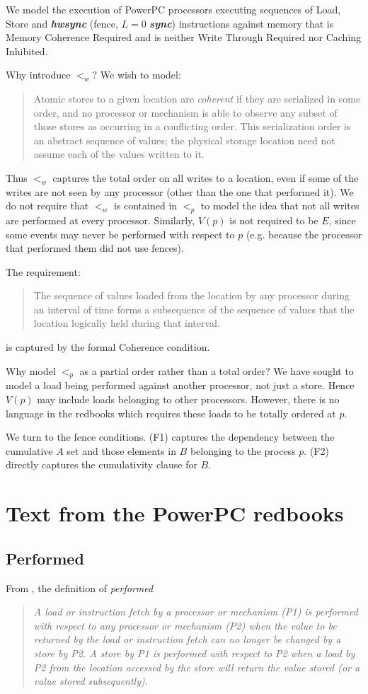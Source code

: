 \documentclass[10pt]{article}
\def\sync{\mbox{\bf\em sync}}
\begin{document}
We model the execution of PowerPC processors executing sequences of
Load, Store and {\em\bf hwsync} (fence, $L=0$ \sync) instructions
against memory that is Memory Coherence Required and is neither Write
Through Required nor Caching Inhibited.


Why introduce $<_w$? We wish to model:
\begin{quotation}
  Atomic stores to a given location are {\em coherent} if they
  are serialized in some order, and no processor or mechanism is able to
  observe any subset of those stores as occurring in a conflicting
  order. This serialization order is an abstract sequence of values; the
  physical storage location need not assume each of the values written to
  it. 
\end{quotation}
Thus $<_w$ captures the total order on all writes to a location, even
if some of the writes are not seen by any processor (other than the
one that performed it).  We do not require that $<_w$ is contained in
$<_p$ to model the idea that not all writes are performed at every
processor. Similarly, $V(p)$ is not required to be $E$, since some
events may never be performed with respect to $p$ (e.g.{} because the
processor that performed them did not use fences).

The requirement:
\begin{quotation}
The sequence of values loaded from the location by any processor
during an interval of time forms a subsequence of the sequence of
values that the location logically held during that interval.
\end{quotation}
is captured by the formal Coherence condition.

Why model $<_p$ as a partial order rather than a total order?  We have
sought to model a load being performed against another processor, not
just a store. Hence $V(p)$ may include loads belonging to other
processors. However, there is no language in the redbooks which
requires these loads to be totally ordered at $p$.

We turn to the fence conditions. (F1) captures the dependency between
the cumulative $A$ set and those elements in $B$ belonging to the
process $p$. (F2) directly captures the cumulativity clause for $B$.

\section{Text from the PowerPC redbooks}

\subsection{Performed}\label{sec:performed}
From \cite[p.~10]{ppc-2}, the definition of {\em performed}
\begin{quotation}
{\em 
A load or instruction fetch by a processor or mechanism (P1) is
performed with respect to any processor or mechanism (P2) when the
value to be returned by the load or instruction fetch can no longer be
changed by a store by P2. A store by P1 is performed with respect to
P2 when a load by P2 from the location accessed by the store will
return the value stored (or a value stored subsequently). 
}  
\end{quotation}
\end{document}
